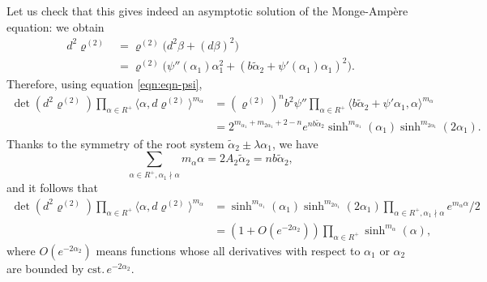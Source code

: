 \documentclass[10pt]{amsart}
\theoremstyle{plain}
\theoremstyle{definition}
\newcommand{\ta}{\tilde \alpha}
\newcommand{\rRoots}{R}
\newcommand{\rhodeux}{\varrho^{(2)}}
\begin{document}
Let us check that this gives indeed an asymptotic solution of the Monge-Ampère equation: we obtain
\begin{align*}
d^2\rhodeux & = \rhodeux \big( d^2\beta+(d\beta)^2 \big) \\
& = \rhodeux \big( \psi''(\alpha_1) \alpha_1^2 + (b\ta_2+\psi'(\alpha_1)\alpha_1)^2 \big).
\end{align*}
Therefore, using equation \eqref{eqn:eqn-psi},
\begin{align*}
\det(d^2\rhodeux) \prod_{\alpha\in \rRoots^+}\langle\alpha,d\rhodeux\rangle^{m_\alpha} &
= (\rhodeux)^n b^2\psi'' \prod_{\alpha\in \rRoots^+}\langle b\ta_2+\psi'\alpha_1,\alpha\rangle^{m_{\alpha}} \\
& = 2^{m_{\alpha_1}+m_{2\alpha_1}+2-n}e^{nb\ta_2} \sinh^{m_{\alpha_1}}(\alpha_1) \sinh^{m_{2\alpha_1}}(2\alpha_1).
\end{align*}
Thanks to the symmetry of the root system $\ta_2\pm \lambda\alpha_1$, we have
\[ \sum_{\alpha\in \rRoots^+,\alpha_1\nmid\alpha} m_\alpha \alpha = 2 A_2 \ta_2 = nb \ta_2, \]
and it follows that
\begin{align*}
\det(d^2\rhodeux) \prod_{\alpha\in \rRoots^+}\langle\alpha,d\rhodeux\rangle^{m_\alpha}
& = \sinh^{m_{\alpha_1}}(\alpha_1) \sinh^{m_{2\alpha_1}}(2\alpha_1) \prod_{\alpha\in \rRoots^+,\alpha_1\nmid\alpha}e^{m_\alpha \alpha}/2 \\
& = (1+O(e^{-2\alpha_2})) \prod_{\alpha\in \rRoots^+} \sinh^{m_\alpha}(\alpha),
\end{align*}
where $O(e^{-2\alpha_2})$ means functions whose all derivatives with respect to $\alpha_1$ or $\alpha_2$ are bounded by $\mathrm{cst.}\, e^{-2\alpha_2}$.
\end{document}
